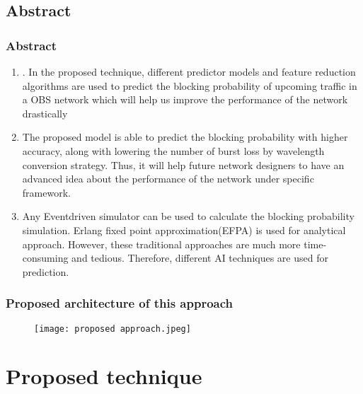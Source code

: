 \documentclass{beamer}
\begin{document}
\subsection*{Abstract}
\begin{frame}[fragile]
\frametitle{Abstract}
\begin{block}{}
   \begin{enumerate}
\item . In the proposed technique, different predictor models and feature reduction algorithms are used to predict the blocking probability of upcoming traffic in a OBS network which will help us improve the performance of the
network drastically
\item The proposed model is able to predict the blocking probability with higher accuracy, along with lowering the number of burst loss by wavelength conversion strategy. Thus, it will help future network designers to have an
advanced idea about the performance of the network under specific framework.
\item Any Eventdriven simulator can be used to calculate the blocking probability simulation. Erlang fixed point approximation(EFPA) is used for analytical approach. However, these traditional approaches are much more time-consuming and tedious. Therefore, different AI techniques are used for prediction.
\end{enumerate}
\end{block}
\end{frame}

\begin{frame}[fragile]
\frametitle{Proposed architecture of this approach}
\begin{figure}
    \texttt{[image: proposed approach.jpeg]}
\end{figure}
\end{frame}

\section{\textbf{Proposed technique}}
\end{document}
